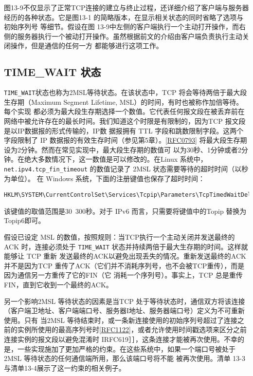 图13-9不仅显示了正常TCP连接的建立与终止过程，还详细介绍了客户端与服务器经历的各种状态。它是图13-1
的简略版本，在显示相关状态的同时省略了选项与初始序列号
等细节。假设在图
13-9中左侧的客户端执行一个主动打开操作，而右侧的服务器执行一个被动打开操作。虽然根据前文的介绍由客户端负责执行主动关闭操作，但是通信的任何一方
都能够进行这项工作。

\subsection{ TIME\_WAIT 状态 }
\verb|TIME_WAIT|状态也称为2MSL等待状态。在该状态中，TCP 将会等待两倍于最大段生存期（Maximum Segment
Lifetime, MSL）的时间，有时也被称作加倍等待。每个实现
都必须为最大段生存期选择一个数值。它代表任何报文段在被丢弃前在网络中被允许存在的最长时间。我们知道这个时限是有限制的，因为TCP
报文段是以IP数据报的形式传输的，IP数
据报拥有 TTL 字段和跳数限制字段。这两个字段限制了 IP
数据报的有效生存时间（参见第5章）。\href{https://www.rfc-editor.org/rfc/rfc0793}{[RFC0793]}
将最大段生存期设为2分钟。然而在常见实现中，最大段生存期的数值可
以为30秒、1分钟或者2分钟。在绝大多数情况下，这一数值是可以修改的。在Linux
系统中，\verb|net.ipv4.tcp_fin_timeout| 的数值记录了 2MSL 状态需要等待的超时时间（以秒为单位）。
在 Windows 系统，下面的注册键值也保存了超时时间：
\begin{lstlisting}[language=bash]
HKLM\SYSTEM\CurrentControlSet\Services\Tcpip\Parameters\TcpTimedWaitDelay
\end{lstlisting}
该键值的取值范围是30~300秒。对于 IPv6 而言，只需要将键值中的Topip 替换为 Topip6即可。

假设已设定 MSL 的数值，按照规则：当TCP执行一个主动关闭并发送最终的ACK 时，连接必须处于 \verb|TIME_WAIT|
状态并持续两倍于最大生存期的时间。这样就能够让 TCP 重新
发送最终的ACK以避免出现丢失的情况。重新发送最终的ACK 并不是因为TCP
重传了ACK（它们并不消耗序列号，也不会被TCP重传），而是因为通信另一方重传了它的FIN（它
消耗一个序列号）。事实上，TCP 总是重传 FIN，直到它收到一个最终的ACK。

另一个影响2MSL 等待状态的因素是当TCP 处于等待状态时，通信双方将该连接（客户端卫地址、客户端端口号、服务器I地址、服务器端口号）定义为不可重新使用。只有
当2MSL
等待结束时，或一条新连接使用的初始序列号超过了连接之前的实例所使用的最高序列号时\href{https://www.rfc-editor.org/rfc/rfc1122}{[RFC1122]}，或者允许使用时间戳选项来区分之前连接实例的报文段以避免混淆时
IRFC619］］，这条连接才能被再次使用。不幸的是，一些实现施加了更加严格的约束。在这些系统中，如果一个端口号被处于 2MSL
等待状态的任何通信端所用，那么该端口号将不能
被再次使用。清单 13-3与清单13-4展示了这一约束的相关例子。


